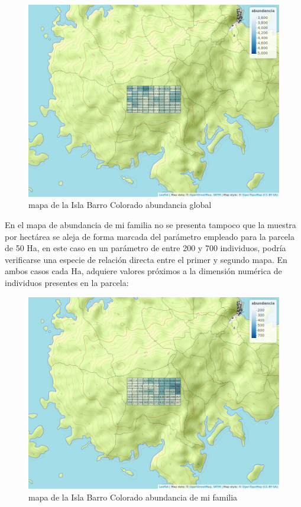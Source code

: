 \documentclass[11pt,]{article}
\begin{document}
\begin{figure}
\centering
\includegraphics[width=1.00000\textwidth]{mapa_cuadros_abun_global.png}
\caption{mapa de la Isla Barro Colorado abundancia global
\label{fig:bci_map}}
\end{figure}

En el mapa de abundancia de mi familia no se presenta tampoco que la
muestra por hectárea se aleja de forma marcada del parámetro empleado
para la parcela de 50 Ha, en este caso en un parámetro de entre 200 y
700 individuos, podría verificarse una especie de relación directa entre
el primer y segundo mapa. En ambos casos cada Ha, adquiere valores
próximos a la dimensión numérica de individuos presentes en la parcela:

\begin{figure}
\centering
\includegraphics[width=1.00000\textwidth]{mapa_cuadros_abun_mi_familia.png}
\caption{mapa de la Isla Barro Colorado abundancia de mi familia
\label{fig:bci_map}}
\end{figure}
\end{document}
